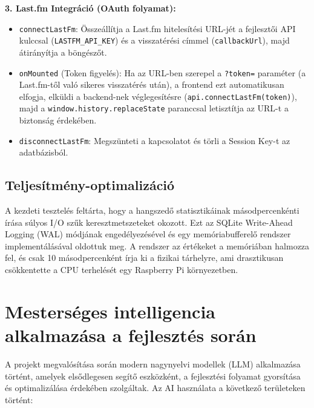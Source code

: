 \textbf{3. Last.fm Integráció (OAuth folyamat):}
\begin{itemize}
    \item \texttt{connectLastFm}: Összeállítja a Last.fm hitelesítési URL-jét a fejlesztői API kulccsal (\texttt{LASTFM\_API\_KEY}) és a visszatérési címmel (\texttt{callbackUrl}), majd átirányítja a böngészőt.
    \item \texttt{onMounted} (Token figyelés): Ha az URL-ben szerepel a \texttt{?token=} paraméter (a Last.fm-től való sikeres visszatérés után), a frontend ezt automatikusan elfogja, elküldi a backend-nek véglegesítésre (\texttt{api.connectLastFm(token)}), majd a \texttt{window.history.replaceState} paranccsal letisztítja az URL-t a biztonság érdekében.
    \item \texttt{disconnectLastFm}: Megszünteti a kapcsolatot és törli a Session Key-t az adatbázisból.
\end{itemize}

\subsection{Teljesítmény-optimalizáció}
A kezdeti tesztelés feltárta, hogy a hangszedő statisztikáinak másodpercenkénti írása súlyos I/O szűk keresztmetszeteket okozott. Ezt az SQLite Write-Ahead Logging (WAL) módjának engedélyezésével és egy memóriabufferelő rendszer implementálásával oldottuk meg. A rendszer az értékeket a memóriában halmozza fel, és csak 10 másodpercenként írja ki a fizikai tárhelyre, ami drasztikusan csökkentette a CPU terhelését egy Raspberry Pi környezetben.

\section{Mesterséges intelligencia alkalmazása a fejlesztés során}
A projekt megvalósítása során modern nagynyelvi modellek (LLM) alkalmazása történt, amelyek elsődlegesen segítő eszközként, a fejlesztési folyamat gyorsítása és optimalizálása érdekében szolgáltak. Az AI használata a következő területeken történt:


